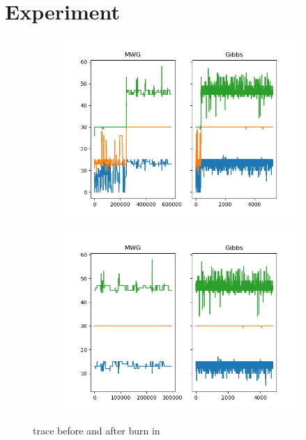 

\section{Experiment}

\begin{figure}[h]
    \centering
	\begin{subfigure}
	    \centering
    	\includegraphics[width=0.3\linewidth]{../../plots/Trace_M4_N60_NMCMC3_seed4_diffind2.png}
	\end{subfigure}
	\begin{subfigure}
	    \centering
    	\includegraphics[width=0.3\linewidth]{../../plots/Trace_post_burnin_M4_N60_NMCMC3_seed4_diffind2.png}
	\end{subfigure}
	\caption{trace before and after burn in}
\end{figure}

